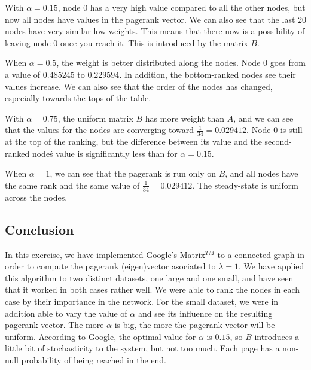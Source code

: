 \documentclass[]{article}
\begin{document}
With $\alpha = 0.15$, node $0$ has a very high value compared to all the other nodes, but now all nodes have values in the pagerank vector. We can also see that the last 20 nodes have very similar low weights. This means that there now is a possibility of leaving node $0$ once you reach it. This is introduced by the matrix $B$.

When $\alpha = 0.5$, the weight is better distributed along the nodes. Node $0$ goes from a value of $0.485245$ to $0.229594$. In addition, the bottom-ranked nodes see their values increase. We can also see that the order of the nodes has changed, especially towards the tops of the table.

With $\alpha = 0.75$, the uniform matrix $B$ has more weight than $A$, and we can see that the values for the nodes are converging toward $\frac{1}{34} = 0.029412$. Node $0$ is still at the top of the ranking, but the difference between its value and the second-ranked nodeś value is significantly less than for $\alpha = 0.15$.

When $\alpha = 1$, we can see that the pagerank is run only on $B$, and all nodes have the same rank and the same value of $\frac{1}{34} = 0.029412$. The steady-state is uniform across the nodes.

\subsection*{Conclusion}
In this exercise, we have implemented Google's Matrix$^{TM}$ to a connected graph in order to compute the pagerank (eigen)vector asociated to $\lambda = 1$. We have applied this algorithm to two distinct datasets, one large and one small, and have seen that it worked in both cases rather well. We were able to rank the nodes in each case by their importance in the network. For the small dataset, we were in addition able to vary the value of $\alpha$ and see its influence on the resulting pagerank vector. The more $\alpha$ is big, the more the pagerank vector will be uniform. According to Google, the optimal value for $\alpha$ is $0.15$, so $B$ introduces a little bit of stochasticity to the system, but not too much. Each page has a non-null probability of being reached in the end.
\end{document}
